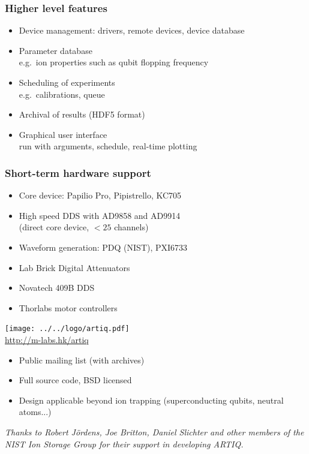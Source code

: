 \documentclass[final,presentation,compress]{beamer}
\begin{document}
\begin{frame}
  \frametitle{Higher level features}
  \footnotesize
  \begin{itemize}
  \item Device management: drivers, remote devices, device database
  \item Parameter database \\
       e.g.\ ion properties such as qubit flopping frequency
  \item Scheduling of experiments \\
      e.g.\ calibrations, queue
  \item Archival of results (HDF5 format)
  \item Graphical user interface \\ 
  	run with arguments, schedule, real-time plotting
  \end{itemize}
\end{frame}


\begin{frame}
  \frametitle{Short-term hardware support}
  \footnotesize
  \begin{itemize}
  \item Core device: Papilio Pro, Pipistrello, KC705
  \item High speed DDS with AD9858 and AD9914 \\
  	(direct core device, $ < 25$ channels)
  \item Waveform generation: PDQ (NIST), PXI6733
  \item Lab Brick Digital Attenuators
  \item Novatech 409B DDS
  \item Thorlabs motor controllers
  \end{itemize}
\end{frame}  

\begin{frame}
  \begin{center}
  \texttt{[image: ../../logo/artiq.pdf]} \\
  \url{http://m-labs.hk/artiq}
  \end{center}

  \footnotesize
  \begin{itemize}
    \item Public mailing list (with archives)
    \item Full source code, BSD licensed
    \item Design applicable beyond ion trapping (superconducting qubits,
      neutral atoms...)
  \end{itemize}
  \textit{Thanks to Robert J\"ordens, Joe Britton, Daniel Slichter and other members of the NIST Ion Storage Group for their support in developing ARTIQ.}

\end{frame}
\end{document}
